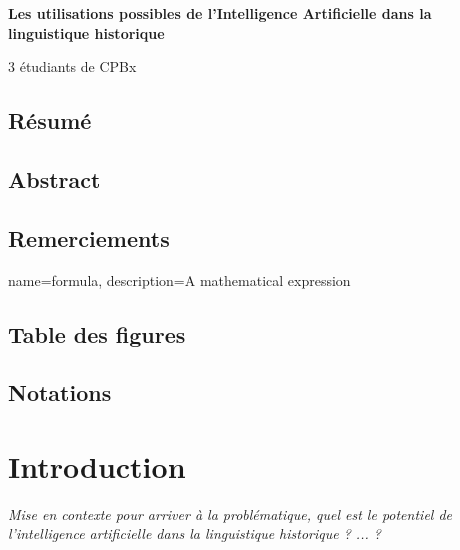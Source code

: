 \documentclass[12pt, french]{report}
\begin{document}
\pagestyle{fancy}
\fancyhead{}
\fancyhead[R]{\nouppercase{\hfill\leftmark}\\}
\fancyhead[L]{\nouppercase{\rightmark\hfill}}
\begin{titlepage}
    \centering
    \vspace*{\fill}

    \huge\bfseries
    Les utilisations possibles de l'Intelligence Artificielle dans la linguistique historique
    
    \vspace*{1.5cm}
    \large 3 étudiants de CPBx
    
    \vspace*{\fill}
\end{titlepage}

\null
\thispagestyle{empty}
\newpage %
\section{Résumé}
\section{Abstract}
\section{Remerciements}

\tableofcontents
\listoffigures
\listoftables %
\makeglossary

{
        name=formula,
        description={A mathematical expression}
}



\section{Table des figures}
\section{Notations}

\chapter{Introduction}
\textit{Mise en contexte pour arriver à la problématique, quel est le potentiel de l'intelligence artificielle dans la linguistique historique ? ... ?}
\end{document}
